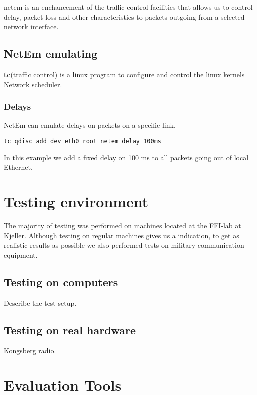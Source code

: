 
\gls{netem} is an enchancement of the traffic control facilities that allows us
to control delay, packet loss and other characteristics to packets outgoing from
a selected network interface.

\subsection{NetEm emulating}

\textbf{tc}(traffic control) is a linux program to configure and control the
linux kernels Network scheduler.

\subsubsection{Delays}

NetEm can emulate delays on packets on a specific link.

\begin{lstlisting}[frame=single, caption="Emulating delay"]
  tc qdisc add dev eth0 root netem delay 100ms
\end{lstlisting}

In this example we add a fixed delay on 100 ms to all packets going out of local
Ethernet.

\section{Testing environment}

The majority of testing was performed on machines located at the FFI-lab at
Kjeller. Although testing on regular machines gives us a indication, to get as
realistic results as possible we also performed tests on military communication
equipment.

\subsection{Testing on computers}
Describe the test setup.

\subsection{Testing on real hardware}
Kongsberg radio.


\section{Evaluation Tools}
